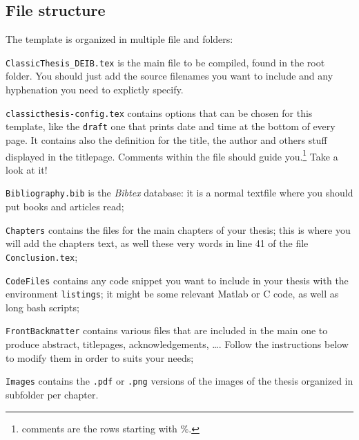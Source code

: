 \subsection{File structure}
The template is organized in multiple file and folders:
\begin{aenumerate}

	\item \verb!ClassicThesis_DEIB.tex! is the main file to be compiled, found in the root folder.
	You should just add the source filenames you want to include and any hyphenation you need to explictly specify. 

	\item \verb!classicthesis-config.tex! contains options that can be chosen for this template, like the \verb!draft! one that prints date and time at the bottom of every page.
	It contains also the definition for the title, the author and others stuff displayed in the titlepage.
	Comments within the file should guide you.\footnote{comments are the rows starting with $\%$.} 
	Take a look at it!

	\item \verb!Bibliography.bib! is the \emph{Bibtex} database: it is a normal textfile where you should put books and articles read;

	\item \verb!Chapters! contains the files for the main chapters of your thesis; this is where you will add the chapters text, as well these very words in line 41 of the file \verb!Conclusion.tex!;

	\item \verb!CodeFiles! contains any code snippet you want to include in your thesis with the environment \verb!listings!; it might be some relevant Matlab or C code, as well as long bash scripts;

	\item \verb!FrontBackmatter! contains various files that are included in the main one to produce abstract, titlepages, acknowledgements, \ldots. 
	Follow the instructions below to modify them in order to suits your needs;

	\item \verb!Images! contains the \verb!.pdf! or \verb!.png! versions of the images of the thesis organized in subfolder per chapter.

\end{aenumerate}

